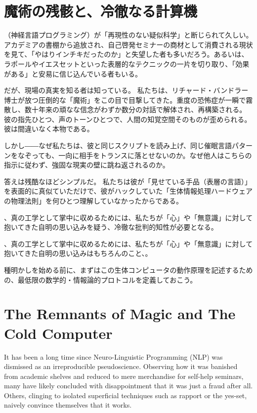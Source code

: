 \ifja
    \chapter{魔術の残骸と、冷徹なる計算機}
    \abbrNLP（神経言語プログラミング）が「再現性のない疑似科学」と断じられて久しい。アカデミアの書棚から追放され、自己啓発セミナーの商材として消費される現状を見て、「やはりインチキだったのか」と失望した者も多いだろう。あるいは、ラポールやイエスセットといった表層的なテクニックの一片を切り取り、「効果がある」と安易に信じ込んでいる者もいる。

    だが、現場の真実を知る者は知っている。
    私たちは、リチャード・バンドラー博士が放つ圧倒的な「魔術」をこの目で目撃してきた。重度の恐怖症が一瞬で霧散し、数十年来の頑なな信念がわずか数分の対話で解体され、再構築される。彼の指先ひとつ、声のトーンひとつで、人間の知覚空間そのものが歪められる。彼は間違いなく本物である。

    しかし――なぜ私たちは、彼と同じスクリプトを読み上げ、同じ催眠言語パターンをなぞっても、一向に相手をトランスに落とせないのか。なぜ他人はこちらの指示に従わず、強固な現実の壁に跳ね返されるのか。

    答えは残酷なほどシンプルだ。
    私たちは彼が「見せている手品（表層の言語）」を表面的に真似ていただけで、彼がハックしていた「生体情報処理ハードウェアの物理法則」を何ひとつ理解していなかったからである。

    、真の工学として掌中に収めるためには、私たちが「心」や「無意識」に対して抱いてきた自明の思い込みを疑う、冷徹な批判的知性が必要となる。

    、真の工学として掌中に収めるためには、私たちが「心」や「無意識」に対して抱いてきた自明の思い込みはもちろんのこと、。

    種明かしを始める前に、まずはこの生体コンピュータの動作原理を記述するための、最低限の数学的・情報論的プロトコルを定義しておこう。
\else
    \chapter{The Remnants of Magic and The Cold Computer}
    It has been a long time since Neuro-Linguistic Programming (NLP) was dismissed as an irreproducible pseudoscience. Observing how it was banished from academic shelves and reduced to mere merchandise for self-help seminars, many have likely concluded with disappointment that it was just a fraud after all. Others, clinging to isolated superficial techniques such as rapport or the yes-set, naively convince themselves that it works.

